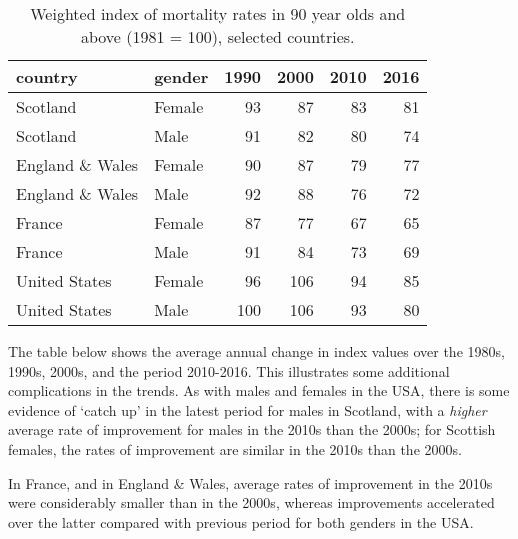 \documentclass[]{article}
\begin{document}
\begin{table}

\caption{\label{tab:unnamed-chunk-11}Weighted index of mortality rates in 90 year olds and above (1981 = 100), selected countries.}
\centering
\begin{tabular}[t]{l|l|r|r|r|r}
\hline
country & gender & 1990 & 2000 & 2010 & 2016\\
\hline
Scotland & Female & 93 & 87 & 83 & 81\\
\hline
Scotland & Male & 91 & 82 & 80 & 74\\
\hline
England \& Wales & Female & 90 & 87 & 79 & 77\\
\hline
England \& Wales & Male & 92 & 88 & 76 & 72\\
\hline
France & Female & 87 & 77 & 67 & 65\\
\hline
France & Male & 91 & 84 & 73 & 69\\
\hline
United States & Female & 96 & 106 & 94 & 85\\
\hline
United States & Male & 100 & 106 & 93 & 80\\
\hline
\end{tabular}
\end{table}

The table below shows the average annual change in index values over the
1980s, 1990s, 2000s, and the period 2010-2016. This illustrates some
additional complications in the trends. As with males and females in the
USA, there is some evidence of `catch up' in the latest period for males
in Scotland, with a \emph{higher} average rate of improvement for males
in the 2010s than the 2000s; for Scottish females, the rates of
improvement are similar in the 2010s than the 2000s.

In France, and in England \& Wales, average rates of improvement in the
2010s were considerably smaller than in the 2000s, whereas improvements
accelerated over the latter compared with previous period for both
genders in the USA.
\end{document}
